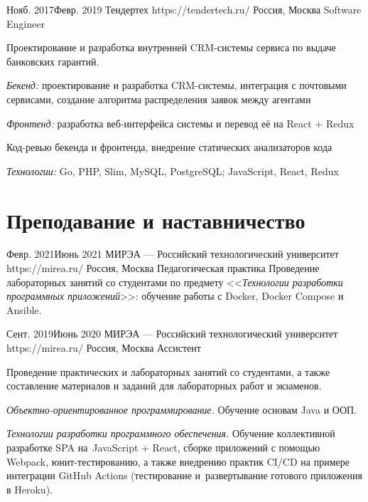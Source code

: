 \documentclass[10pt]{article}
\begin{document}
\job
	{Нояб. 2017}{Февр. 2019}
	{Тендертех}
	{https://tendertech.ru/}
	{Россия, Москва}
	{Software Engineer}
	{
	  Проектирование и разработка внутренней CRM-системы сервиса по выдаче банковских гарантий.

	  \begin{supercompactitemize}
	  	\item \textit{Бекенд:} проектирование и разработка CRM-системы, интеграция с почтовыми сервисами, создание алгоритма распределения заявок между агентами
		\item \textit{Фронтенд:} разработка веб-интерфейса системы и перевод её на React + Redux
		\item Код-ревью бекенда и фронтенда, внедрение статических анализаторов кода
	  \end{supercompactitemize}

	  \textit{Технологии:} Go, PHP, Slim, MySQL, PostgreSQL; JavaScript, React, Redux
	}


\section{Преподавание и наставничество}

\job
	{Февр. 2021}{Июнь 2021}
	{МИРЭА --- Российский технологический университет}
	{https://mirea.ru/}
	{Россия, Москва}
	{Педагогическая практика}
	{
	  Проведение лабораторных занятий со студентами по предмету <<\textit{Технологии разработки программных приложений}>>: обучение работы с Docker, Docker Compose и Ansible.
	}

\job
	{Сент. 2019}{Июнь 2020}
	{МИРЭА --- Российский технологический университет}
	{https://mirea.ru/}
	{Россия, Москва}
	{Ассистент}
	{
	  Проведение практических и лабораторных занятий со студентами, а также составление материалов и заданий для лабораторных работ и экзаменов.

	  \begin{supercompactitemize}
	  	\item \textit{Объектно-ориентированное программирование.} Обучение основам Java и ООП.
		\item \textit{Технологии разработки программного обеспечения.} Обучение коллективной разработке SPA на~JavaScript + React, сборке приложений с помощью Webpack, юнит-тестированию, а также внедрению практик CI/CD на примере интеграции GitHub Actions (тестирование и~развертывание готового приложения в Heroku).
	  \end{supercompactitemize}
	}
\end{document}
